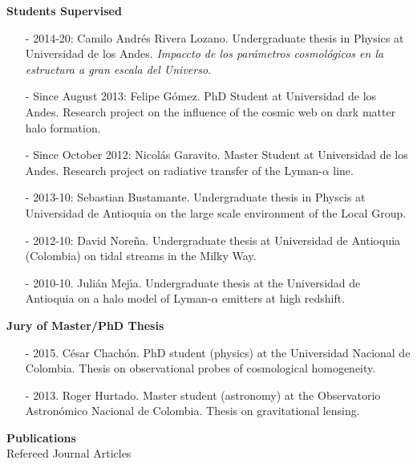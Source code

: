 \documentclass[letterpaper,11pt,onecolumn]{article}
\begin{document}
{\bf Students Supervised}
\begin{itemize}

\item[-] 2014-20: Camilo Andr\'es Rivera Lozano. Undergraduate thesis
  in Physics at Universidad de los Andes. \emph{Impaccto de los
    par\'ametros cosmol\'ogicos en la 
    estructura a gran escala del Universo}.
\item[-] Since August 2013: Felipe G\'omez. PhD Student at
  Universidad de los Andes. Research project on the
  influence of the cosmic web on dark matter halo formation. 
\item[-] Since October 2012: Nicol\'as Garavito. Master Student
  at Universidad de los Andes. Research project on
  radiative transfer of the  Lyman-$\alpha$ line.  
\item[-] 2013-10: Sebastian Bustamante. Undergraduate thesis in
  Physcis at Universidad de Antioquia on the large scale environment
  of the Local Group.  
\item[-] 2012-10: David Nore\~na. Undergraduate thesis at Universidad
  de Antioquia (Colombia) on tidal streams in the Milky Way. 
\item[-] 2010-10. Juli\'an Mej\'{\i}a. Undergraduate thesis at the
  Universidad de Antioquia on a halo model of
  Lyman-$\alpha$ emitters at high redshift. 
\end{itemize}


{\bf Jury of Master/PhD Thesis}
\begin{itemize}
\item[-] 2015. C\'esar Chach\'on. PhD student (physics) at the Universidad Nacional de Colombia. Thesis on observational probes of cosmological homogeneity.
\item[-] 2013. Roger Hurtado. Master student (astronomy) at the Observatorio Astron\'omico Nacional de Colombia. Thesis on gravitational lensing.
\end{itemize}

{\bf Publications}\\

\indent
Refereed Journal Articles\\
\end{document}
